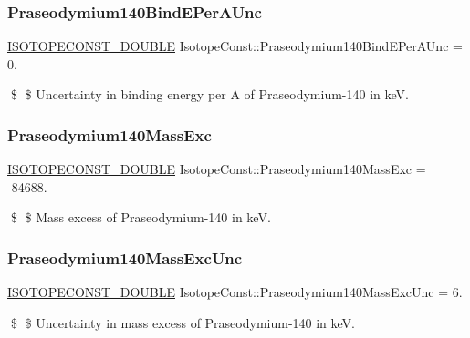 \subsubsection{\texorpdfstring{Praseodymium140\+Bind\+E\+Per\+A\+Unc}{Praseodymium140BindEPerAUnc}}
{\footnotesize\ttfamily \mbox{\hyperlink{group___isotope_const-_macros_ga8f45a7272ce02c0b4c65c44636ed719a}{I\+S\+O\+T\+O\+P\+E\+C\+O\+N\+S\+T\+\_\+\+D\+O\+U\+B\+LE}} Isotope\+Const\+::\+Praseodymium140\+Bind\+E\+Per\+A\+Unc = 0.}

\$ \$ Uncertainty in binding energy per A of Praseodymium-\/140 in keV. \mbox{\label{group___isotope_const-_praseodymium-_pr140_ga2b655a7c228d0e4bfd6244fe939c74af}} 
\subsubsection{\texorpdfstring{Praseodymium140\+Mass\+Exc}{Praseodymium140MassExc}}
{\footnotesize\ttfamily \mbox{\hyperlink{group___isotope_const-_macros_ga8f45a7272ce02c0b4c65c44636ed719a}{I\+S\+O\+T\+O\+P\+E\+C\+O\+N\+S\+T\+\_\+\+D\+O\+U\+B\+LE}} Isotope\+Const\+::\+Praseodymium140\+Mass\+Exc = -\/84688.}

\$ \$ Mass excess of Praseodymium-\/140 in keV. \mbox{\label{group___isotope_const-_praseodymium-_pr140_ga6223e21a51ce4eb9bb0a06ecfdec4607}} 
\subsubsection{\texorpdfstring{Praseodymium140\+Mass\+Exc\+Unc}{Praseodymium140MassExcUnc}}
{\footnotesize\ttfamily \mbox{\hyperlink{group___isotope_const-_macros_ga8f45a7272ce02c0b4c65c44636ed719a}{I\+S\+O\+T\+O\+P\+E\+C\+O\+N\+S\+T\+\_\+\+D\+O\+U\+B\+LE}} Isotope\+Const\+::\+Praseodymium140\+Mass\+Exc\+Unc = 6.}

\$ \$ Uncertainty in mass excess of Praseodymium-\/140 in keV. \mbox{\label{group___isotope_const-_praseodymium-_pr140_gae79700a3f03dd0add6e0d163fc8c539b}} 
